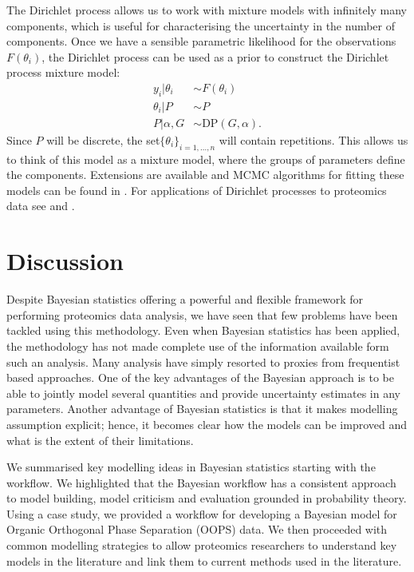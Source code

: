 \documentclass[12pt,english, journal=jpr, layout=twocolumn]{article}
\begin{document}
The Dirichlet process allows us to work with mixture models with infinitely many components, which is useful for characterising the uncertainty in the number of components. Once we have a sensible parametric likelihood for the observations $F(\theta_i)$, the Dirichlet process can be used as a prior to construct the Dirichlet process mixture model:
\begin{equation}
\begin{split}
y_i|\theta_i &\sim F(\theta_i)\\
\theta_i|P &\sim P \\
P|\alpha, G & \sim \text{DP}(G, \alpha).
\end{split}
\end{equation}
Since $P$ will be discrete, the set$\{\theta_i\}_{i = 1,...,n}$ will contain repetitions. This allows us to think of this model as a mixture model, where the groups of parameters define the components. Extensions are available \citep{Teh::2006, Rodriguez::2008} and MCMC algorithms for fitting these models can be found in \citet{Neal::2000}. For applications of Dirichlet processes to proteomics data see \citet{Claassen::2009} and \citet{Choi::2010}.

\section{Discussion}
Despite Bayesian statistics offering a powerful and flexible framework for performing proteomics data analysis, we have seen that few problems have been tackled using this methodology. Even when Bayesian statistics has been applied, the methodology has not made complete use of the information available form such an analysis. Many analysis have simply resorted to proxies from frequentist based approaches. One of the key advantages of the Bayesian approach is to be able to jointly model several quantities and provide uncertainty estimates in any parameters. Another advantage of Bayesian statistics is that it makes modelling assumption explicit; hence, it becomes clear how the models can be improved and what is the extent of their limitations.

We summarised key modelling ideas in Bayesian statistics starting with the workflow. We highlighted that the Bayesian workflow has a consistent approach to model building, model criticism and evaluation grounded in probability theory. Using a case study, we provided a workflow for developing a Bayesian model for Organic Orthogonal Phase Separation (OOPS) data. We then proceeded with common modelling strategies to allow proteomics researchers to understand key models in the literature and link them to current methods used in the literature.
\end{document}

